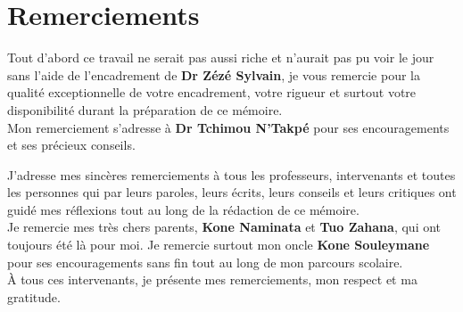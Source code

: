 \chapter*{Remerciements}
	\thispagestyle{empty}
	
	
	Tout d'abord ce travail ne serait pas aussi riche et n'aurait pas pu voir le jour sans l'aide de l'encadrement de \textbf{Dr Zézé Sylvain}, je vous remercie pour la qualité exceptionnelle de votre encadrement, votre rigueur et surtout votre disponibilité durant la préparation de ce mémoire.\\
	
	
	Mon remerciement s'adresse à \textbf{Dr Tchimou N'Takpé} pour ses encouragements et ses précieux conseils.
	
	J’adresse mes sincères remerciements à tous les professeurs, intervenants et toutes les personnes qui par leurs paroles, leurs écrits, leurs conseils et leurs critiques ont guidé mes réflexions tout au long de la rédaction de ce mémoire.\\
	
	Je remercie mes très chers parents, \textbf{Kone Naminata} et \textbf{Tuo Zahana}, qui ont toujours été là pour moi. Je remercie surtout mon oncle \textbf{Kone Souleymane} pour ses encouragements sans fin tout au long de mon parcours scolaire.\\
	
	À tous ces intervenants, je présente mes remerciements, mon respect et ma gratitude.